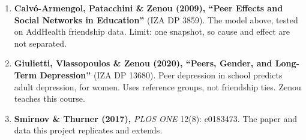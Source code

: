 \documentclass[11pt]{article}
\begin{document}
\begin{enumerate}
  \item \textbf{Calvó-Armengol, Patacchini \& Zenou (2009), ``Peer Effects and Social
        Networks in Education''} (IZA DP 3859). The model above, tested on AddHealth
        friendship data. Limit: one snapshot, so cause and effect are not separated.
  \item \textbf{Giulietti, Vlassopoulos \& Zenou (2020), ``Peers, Gender, and
        Long-Term Depression''} (IZA DP 13680). Peer depression in school predicts adult
        depression, for women. Uses reference groups, not friendship ties. Zenou teaches
        this course.
  \item \textbf{Smirnov \& Thurner (2017),} \emph{PLOS ONE} 12(8): e0183473. The paper
        and data this project replicates and extends.
\end{enumerate}
\end{document}
